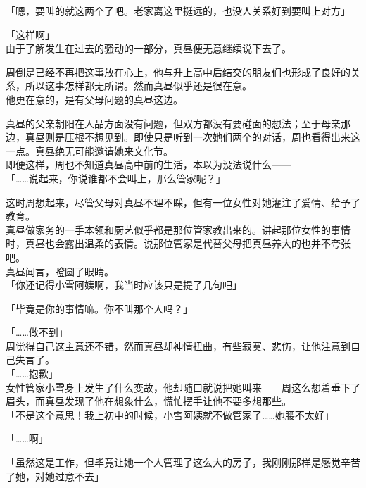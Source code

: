 「嗯，要叫的就这两个了吧。老家离这里挺远的，也没人关系好到要叫上对方」

「这样啊」\\

由于了解发生在过去的骚动的一部分，真昼便无意继续说下去了。

周倒是已经不再把这事放在心上，他与升上高中后结交的朋友们也形成了良好的关系，所以这事怎样都无所谓。然而真昼似乎还是很在意。\\

他更在意的，是有父母问题的真昼这边。

真昼的父亲朝阳在人品方面没有问题，但双方都没有要碰面的想法；至于母亲那边，真昼则是压根不想见到。即使只是听到一次她们两个的对话，周也看得出来这一点。真昼绝无可能邀请她来文化节。\\

即便这样，周也不知道真昼高中前的生活，本以为没法说什么——\\

「……说起来，你说谁都不会叫上，那么管家呢？」

这时周想起来，尽管父母对真昼不理不睬，但有一位女性对她灌注了爱情、给予了教育。\\

真昼做家务的一手本领和厨艺似乎都是那位管家教出来的。讲起那位女性的事情时，真昼也会露出温柔的表情。说那位管家是代替父母把真昼养大的也并不夸张吧。\\

真昼闻言，瞪圆了眼睛。\\

「你还记得小雪阿姨啊，我当时应该只是提了几句吧」

「毕竟是你的事情嘛。你不叫那个人吗？」

「……做不到」\\

周觉得自己这主意还不错，然而真昼却神情扭曲，有些寂寞、悲伤，让他注意到自己失言了。\\

「……抱歉」\\

女性管家小雪身上发生了什么变故，他却随口就说把她叫来——周这么想着垂下了眉头，而真昼发现了他在想象什么，慌忙摆手让他不要多想那些。\\

「不是这个意思！我上初中的时候，小雪阿姨就不做管家了……她腰不太好」

「……啊」

「虽然这是工作，但毕竟让她一个人管理了这么大的房子，我刚刚那样是感觉辛苦了她，对她过意不去」\\

